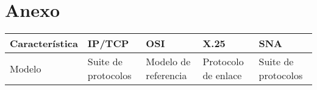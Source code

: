 \chapter*{Anexo}


\begingroup
\renewcommand*{\arraystretch}{1.5}
\small %
\begin{longtable}{|>{\raggedright\arraybackslash}m{2.4cm}|>{\raggedright\arraybackslash}m{2.8cm}|>{\raggedright\arraybackslash}m{2.8cm}|>{\raggedright\arraybackslash}m{2.8cm}|>{\raggedright\arraybackslash}m{2.8cm}|}
    \hline
    \textbf{Característica} & \textbf{IP/TCP}                                                                                                                                                                        & \textbf{OSI}                                                                                                                                                                                                                                         & \textbf{X.25}                                                                                                                                                                                                                                                                                                                                                                    & \textbf{SNA}                                                                                                                                                                                                                                                                           \\ \hline
    Modelo                  & Suite de protocolos                                                                                                                                                                    & Modelo de referencia                                                                                                                                                                                                                                 & Protocolo de enlace                                                                                                                                                                                                                                                                                                                                                              & Suite de protocolos                                                                                                                                                                                                                                                                    \\ \hline

\end{longtable}
